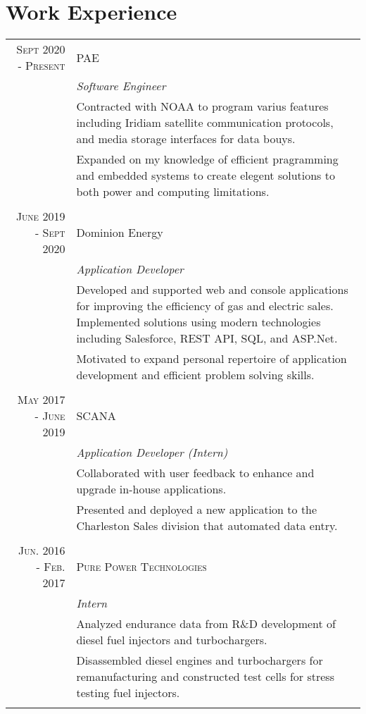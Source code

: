 \documentclass[a4paper,10pt]{article}
\begin{document}
\section{Work Experience}
\begin{tabular}{r|p{11cm}}
 \textsc{Sept 2020 - Present} & PAE
 \\&\emph{Software Engineer}\\
 &\footnotesize{Contracted with NOAA to program varius features including Iridiam satellite communication protocols, and media storage interfaces for data bouys.} \\ & \footnotesize{Expanded on my knowledge of efficient pragramming and embedded systems to create elegent solutions to both power and computing limitations.
 }\\\multicolumn{2}{c}{} \\

 \textsc{June 2019 - Sept 2020} & Dominion Energy
 \\&\emph{Application Developer}\\
 &\footnotesize{Developed and supported web and console applications for improving the efficiency of gas and electric sales.  
Implemented solutions using modern technologies including Salesforce, REST API, SQL, and ASP.Net.} \\ & \footnotesize{Motivated to expand personal repertoire of application development and efficient problem solving skills.
 }\\\multicolumn{2}{c}{} \\

 \textsc{May 2017 - June 2019} & SCANA
 \\&\emph{Application Developer (Intern)}\\
 &\footnotesize{Collaborated with user feedback to enhance and upgrade in-house applications.} \\& \footnotesize{Presented and deployed a new application to the Charleston Sales division that automated data entry.
 }\\\multicolumn{2}{c}{} \\
 

 \textsc{Jun. 2016 - Feb. 2017} & \textsc{Pure Power Technologies} 
 \\&\emph{Intern}\\&\footnotesize{Analyzed endurance data from R\&D development of diesel fuel injectors and turbochargers.} \\& \footnotesize{ 
Disassembled diesel engines and turbochargers for remanufacturing and constructed test cells for stress testing fuel injectors. 
}\\\multicolumn{2}{c}{} 
\end{tabular}
\end{document}
